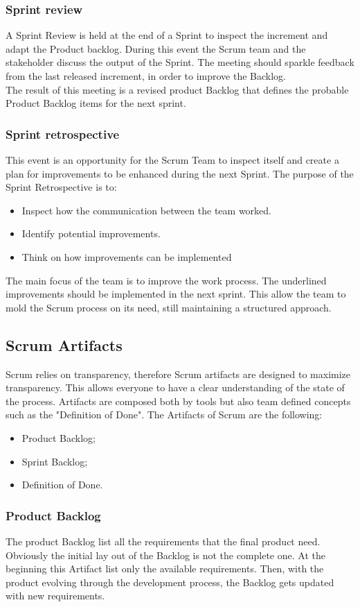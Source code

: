 \documentclass[../main.tex]{subfiles}
\begin{document}
\subsubsection{Sprint review}
A Sprint Review is held at the end of a Sprint to inspect the increment and adapt the Product backlog. During this event the Scrum team and the stakeholder discuss the output of the Sprint. The meeting should sparkle feedback from the last released increment, in order to improve the Backlog.\\
The result of this meeting is a revised product Backlog that defines the probable Product Backlog items for the next sprint.
\subsubsection{Sprint retrospective}
This event is an opportunity for the Scrum Team to inspect itself and create a plan for improvements to be enhanced during the next Sprint. The purpose of the Sprint Retrospective is to:
\begin{itemize}
    \item Inspect how the communication between the team worked.
    \item Identify potential improvements.
    \item Think on how improvements can be implemented
\end{itemize}
The main focus of the team is to improve the work process. The underlined improvements should be implemented in the next sprint. This allow the team to mold the Scrum process on its need, still maintaining a structured approach. 
\subsection{Scrum Artifacts}
Scrum relies on transparency, therefore Scrum artifacts are designed to maximize transparency. This allows everyone to have a clear understanding of the state of the process.
Artifacts are composed both by tools but also team defined concepts such as the "Definition of Done". The Artifacts of Scrum are the following:
\begin{itemize}
    \item Product Backlog;
    \item Sprint Backlog;
    \item Definition of Done. 
\end{itemize}
\subsubsection{Product Backlog}
The product Backlog list all the requirements that the final product need. Obviously the initial lay out of the Backlog is not the complete one. At the beginning this Artifact list only the available requirements. Then, with the product evolving through the development process, the Backlog gets updated with new requirements.\\
\end{document}
